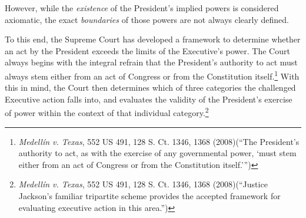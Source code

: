 However, while the \textit{existence} of the President's implied powers is considered axiomatic, the exact \textit{boundaries} of those powers are not always clearly defined.

To this end, the Supreme Court has developed a framework to determine whether an act by the President exceeds the limits of the Executive's power.
The Court always begins with the integral refrain that the President's authority to act must always stem either from an act of Congress or from the Constitution itself.\footnote{\textit{Medellín v. Texas}, 552 US 491, 128 S. Ct. 1346, 1368 (2008)(``The President's authority to act, as with the exercise of any governmental power, `must stem either from an act of Congress or from the Constitution itself.''')}
With this in mind, the Court then determines which of three categories the challenged Executive action falls into, and evaluates the validity of the President's exercise of power within the context of that individual category.\footnote{\textit{Medellín v. Texas}, 552 US 491, 128 S. Ct. 1346, 1368 (2008)(``Justice Jackson's familiar tripartite scheme provides the accepted framework for evaluating executive action in this area.'')}  



